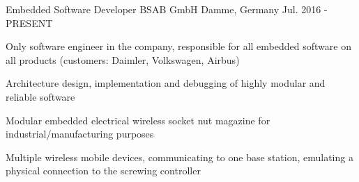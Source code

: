 \begin{cventries}
  \cventry
    {Embedded Software Developer} %
    {BSAB GmbH} %
    {Damme, Germany} %
    {Jul. 2016 - PRESENT} %
    {
      \begin{cvitems} %
        \item {Only software engineer in the company, responsible for all embedded software on all products (customers: Daimler, Volkswagen, Airbus)}
        \item {Architecture design, implementation and debugging of highly modular and reliable software}
        \item {Modular embedded electrical wireless socket nut magazine for industrial/manufacturing purposes}
        \item {Multiple wireless mobile devices, communicating to one base station, emulating a physical connection to the screwing controller}
      \end{cvitems}
    }

\begin{comment}
  \cventry
    {Internship} %
    {DFKI (German Researchcenter for AI) GmbH} %
    {Bremen, Germany} %
    {Oct. 2015 - Dez. 2015} %
    {
      \begin{cvitems} %
        \item {Familiarized with the Xilinx FPGA toolchain and VHDL by implementing PWM, FIFO, UART and I2C}
        \item {Fixed a bug in the VHDL driver of a camera module which prevented using the camera with the highest resolution}
        \item {Implemented a Canny Edge filter and a Circle-Hough-Transformation on a FPGA development kit with camera in VHDL, Qt C++ GUI}
        \item {Bridged the VHDL modules to an emulated Microblaze soft core on the FPGA}
      \end{cvitems}
    }


\end{comment}
\end{cventries}
